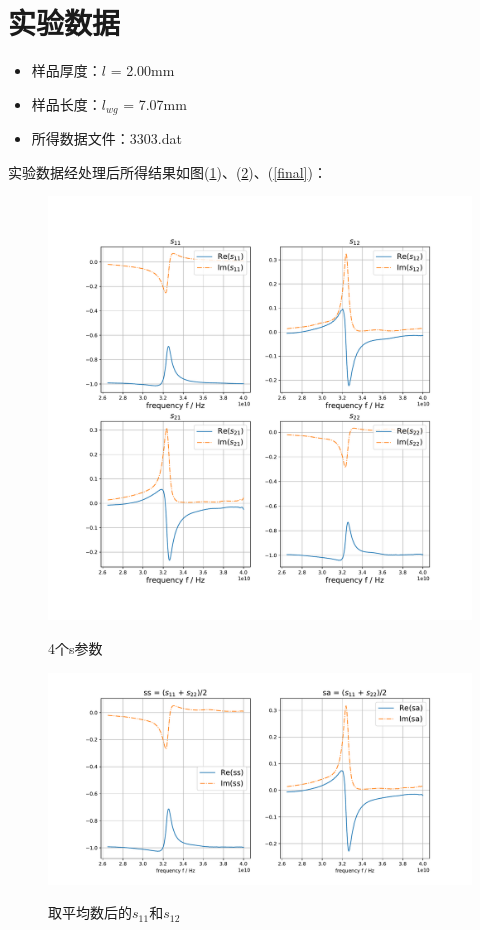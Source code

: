 \documentclass[a4paper]{article}
\begin{document}
\section{实验数据}
\begin{itemize}
\item 样品厚度：$l$ = 2.00mm
\item 样品长度：$l_{wg}$ = 7.07mm
\item 所得数据文件：3303.dat
\end{itemize}
实验数据经处理后所得结果如图(\ref{sPara})、(\ref{sssa})、(\ref{final})：
\begin{figure}[!h]
\centering
\includegraphics[width=12cm]{fig/sParameter.pdf}\\
\caption{4个s参数}\label{sPara}
\end{figure}
\begin{figure}[!h]
\centering
\includegraphics[width=12cm]{fig/sssa.pdf}\\
\caption{取平均数后的$s_{11}$和$s_{12}$}\label{sssa}
\end{figure}
\end{document}

